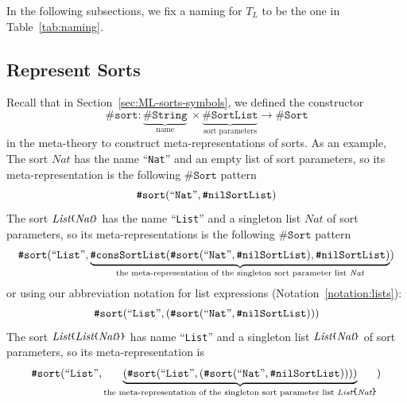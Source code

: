 \documentclass[UTF8,11pt]{article}
\theoremstyle{plain}
\theoremstyle{definition}
\theoremstyle{remark}
\newcommand{\Nat}{\textit{Nat}}
\newcommand{\List}{\textit{List}}
\newcommand{\parametric}[2]{{#1}\raisebox{.2ex}{\texttt{\footnotesize{\{}}}#2\raisebox{.2ex}{\texttt{\footnotesize{\}}}}}
\newcommand{\sharpsymbol}{\#}
\newcommand{\KString}{\texttt{\sharpsymbol String}}
\newcommand{\KSort}{\texttt{\sharpsymbol Sort}}
\newcommand{\Ksort}{\texttt{\sharpsymbol sort}}
\newcommand{\KSortList}{\texttt{\sharpsymbol SortList}}
\newcommand{\KnilKSortList}{\texttt{\sharpsymbol nilSortList}}
\newcommand{\KconsKSortList}{\texttt{\sharpsymbol consSortList}}
\newcommand{\qquottt}[1]{\textrm{``\texttt{#1}''}}
\begin{document}
In the following subsections, we fix a naming for $T_L$ to be the one in 
Table~\ref{tab:naming}.

\subsection{Represent Sorts}
Recall that in Section~\ref{sec:ML-sorts-symbols}, we defined the constructor
$$
\Ksort \colon \underbrace{\KString}_\text{name}\  \times 
\underbrace{\KSortList}_\text{sort parameters} \to \KSort
$$
in the meta-theory to construct meta-representations of sorts.
As an example,
The sort $\Nat$ has the name \qquottt{Nat} and an empty list of sort 
parameters, 
so its 
meta-representation is the following $\KSort$ pattern
$$\Ksort(\qquottt{Nat}, \KnilKSortList)$$
The sort $\parametric{\List}{\Nat}$ has the name \qquottt{List} and a singleton 
list $\Nat$ of sort parameters, so its meta-representations is the following 
$\KSort$ pattern
$$ \Ksort(\qquottt{List}, \underbrace{\KconsKSortList(\Ksort(\qquottt{Nat}, 
\KnilKSortList),\KnilKSortList)}_\text{the meta-representation of the singleton 
sort parameter list $\Nat$})$$
or using our abbreviation notation for list expressions 
(Notation~\ref{notation:lists}):
$$ \Ksort(\qquottt{List}, (\Ksort(\qquottt{Nat},\KnilKSortList)))$$
The sort $\parametric{\List}{\parametric{\List}{\Nat}}$ has name \qquottt{List} 
and a singleton list $\parametric{\List}{\Nat}$ of sort parameters, so its 
meta-representation is
$$ \Ksort(\qquottt{List}, \underbrace{(\Ksort(\qquottt{List}, 
(\Ksort(\qquottt{Nat},\KnilKSortList))))}_\text{the meta-representation of the 
	singleton 
	sort parameter list $\parametric{\List}{\Nat}$})$$
\end{document}
